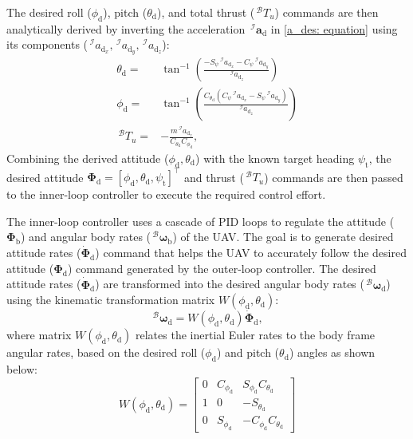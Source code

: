 \documentclass[lettersize,journal]{IEEEtran}
\begin{document}
The desired roll (${\phi}_{\text{d}}$), pitch (${\theta}_{\text{d}}$), and total thrust ($\,^\mathcal{B} T_u$) commands are then analytically derived by inverting the acceleration $\,^\mathcal{I}\boldsymbol{a}_{\text{d}}$ in \eqref{a_des: equation} using its components ($\,^\mathcal{I} {a}_{\text{d}_x}, \,^\mathcal{I} {a}_{\text{d}_y}, \,^\mathcal{I} {a}_{\text{d}_z}$):
\begin{align}
\label{euler_thrust_des: equation}
    {\theta}_{\text{d}} = & \tan^{-1}\left(\frac{- S_\psi \,^\mathcal{I} {a}_{\text{d}_x} - C_\psi \,^\mathcal{I} {a}_{\text{d}_y}}{\,^\mathcal{I} {a}_{\text{d}_z}} \right) \nonumber \\
    {\phi}_{\text{d}} = & \tan^{-1}\left(\frac{C_{\theta_{\text{d}}} \left(C_\psi \,^\mathcal{I} {a}_{\text{d}_x} - S_\psi \,^\mathcal{I} {a}_{\text{d}_y} \right)}{\,^\mathcal{I} {a}_{\text{d}_z}} \right) \nonumber \\
    \,^\mathcal{B} {T}_u = & - \frac{m \,^\mathcal{I} {a}_{\text{d}_z}}{C_{\theta_{\text{d}}} C_{\phi_{\text{d}}}},
\end{align}
Combining the derived attitude ($\phi_{\text{d}}, \theta_{\text{d}}$) with the known target heading $\psi_{\text{t}}$, the desired attitude $\boldsymbol{\Phi}_{\text{d}} = [\phi_{\text{d}}, \theta_{\text{d}}, \psi_{\text{t}}]^\top$ and thrust ($\,^\mathcal{B} T_u$) commands are then passed to the inner-loop controller to execute the required control effort.

The inner-loop controller uses a cascade of PID loops to regulate the attitude ($\boldsymbol{\Phi}_{\text{b}}$) and angular body rates ($\,^\mathcal{B} \boldsymbol{\omega}_{\text{b}}$) of the UAV.
The goal is to generate desired attitude rates ($\dot{\boldsymbol{\Phi}}_{\text{d}}$) command that helps the UAV to accurately follow the desired attitude ($\boldsymbol{\Phi}_{\text{d}}$) command generated by the outer-loop controller.
The desired attitude rates ($\dot{\boldsymbol{\Phi}}_{\text{d}}$) are transformed into the desired angular body rates ($\,^\mathcal{B} \boldsymbol{\omega}_{\text{d}}$) using the kinematic transformation matrix $W(\phi_{\text{d}} ,\theta_{\text{d}} )$:
\begin{equation}
\label{kinematic transformation: equation}
    \,^\mathcal{B} \boldsymbol{\omega}_{\text{d}} = W(\phi_{\text{d}} ,\theta_{\text{d}} ) \dot{\boldsymbol{\Phi}}_{\text{d}},
\end{equation}
where matrix $W(\phi_{\text{d}} ,\theta_{\text{d}} )$ relates the inertial Euler rates to the body frame angular rates, based on the desired roll ($\phi_{\text{d}}$) and pitch ($\theta_{\text{d}}$) angles as shown below:
\begin{equation}
    W(\phi_{\text{d}} ,\theta_{\text{d}} )=\begin{bmatrix} 0 & C_{\phi_{\text{d}}} & S_{\phi_{\text{d}}} C_{\theta_{\text{d}}} \\ 1 & 0 & -S_{\theta_{\text{d}}} \\ 0 & S_{\phi_{\text{d}}} & - C_{\phi_{\text{d}}} C_{\theta_{\text{d}}} \end{bmatrix}
\end{equation}
\end{document}

